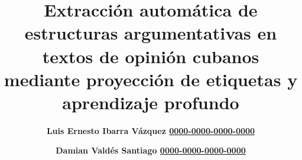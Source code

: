 \documentclass{rcci} %
\newcommand{\orcidaffil}[1]{%
	\href{https://orcid.org/#1}{#1}}
\begin{document}
\renewcommand{\figurename}{\bf Fig.}

\def\tipoarticulo{Art\'iculos originales} %
\def\tematica{Procesamiento de Lenguaje Natural} %
\onehalfspacing
\title{Extracci\'on autom\'atica de estructuras argumentativas en textos de opini\'on cubanos mediante proyecci\'on de etiquetas y aprendizaje profundo}
\def\englistitle{Automatic extraction of argumentative structures in Cuban opinion texts through label projection and deep learning}
\author[1*]{\bf Luis Ernesto Ibarra V\'azquez \orcidaffil{0000-0000-0000-0000}} %
\author[2]{\bf Damian Vald\'es Santiago \orcidaffil{0000-0000-0000-0000}} %
\def\authormail{(\href{mailto:luise98cu@gmail.com}{\nolinkurl{luise98cu@gmail.com}})}
%
\end{document}
